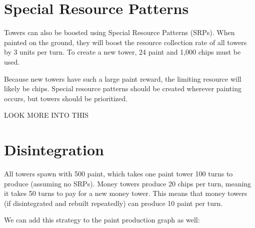 \documentclass{article}
\begin{document}
  \section*{Special Resource Patterns}

  Towers can also be boosted using Special Resource Patterns (SRPs). When painted on the ground, they will boost the resource collection rate of all towers by 3 units per turn. To create a new tower, 24 paint and 1,000 chips must be used. 

  \medskip

  Because new towers have such a large paint reward, the limiting resource will likely be chips. Special resource patterns should be created wherever painting occurs, but towers should be prioritized.

  \begin{center}
    LOOK MORE INTO THIS
  \end{center}

  \section*{Disintegration}

  All towers spawn with 500 paint, which takes one paint tower 100 turns to produce (assuming no SRPs). Money towers produce 20 chips per turn, meaning it takes 50 turns to pay for a new money tower. This means that money towers (if disintegrated and rebuilt repeatedly) can produce 10 paint per turn.

  \medskip

  We can add this strategy to the paint production graph as well:
  \begin{center}
  \end{center}
\end{document}
